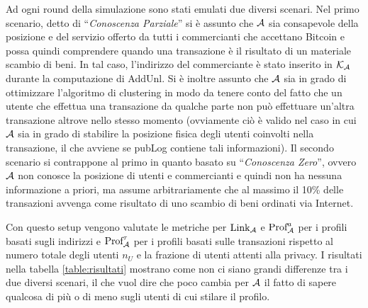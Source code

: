Ad ogni round della simulazione sono stati emulati due diversi scenari.
Nel primo scenario, detto di ``\emph{Conoscenza Parziale}'' si è assunto che $\mathcal{A}$ sia consapevole della posizione e del servizio offerto da tutti i commercianti che accettano Bitcoin e possa quindi comprendere quando una transazione è il risultato di un materiale scambio di beni. In tal caso, l'indirizzo del commerciante è stato inserito in $\mathcal{K}_\mathcal{A}$ durante la computazione di AddUnl. Si è inoltre assunto che $\mathcal{A}$ sia in grado di ottimizzare l'algoritmo di clustering in modo da tenere conto del fatto che un utente che effettua una transazione da qualche parte non può effettuare un'altra transazione altrove nello stesso momento (ovviamente ciò è valido nel caso in cui $\mathcal{A}$ sia in grado di stabilire la posizione fisica degli utenti coinvolti nella transazione, il che avviene se pubLog contiene tali informazioni).
Il secondo scenario si contrappone al primo in quanto basato su ``\emph{Conoscenza Zero}'', ovvero $\mathcal{A}$ non conosce la posizione di utenti e commercianti e quindi non ha nessuna informazione a priori, ma assume arbitrariamente che al massimo il 10\% delle transazioni avvenga come risultato di uno scambio di beni ordinati via Internet.

Con questo setup vengono valutate le metriche per $\text{Link}_{\mathcal{A}}$ e $\text{Prof}^a_{\mathcal{A}}$ per i profili basati sugli indirizzi e $\text{Prof}^\tau_{\mathcal{A}}$ per i profili basati sulle transazioni rispetto al numero totale degli utenti $n_U$ e la frazione di utenti attenti alla privacy.
I risultati nella tabella \ref{table:risultati} mostrano come non ci siano grandi differenze tra i due diversi scenari, il che vuol dire che poco cambia per $\mathcal{A}$ il fatto di sapere qualcosa di più o di meno sugli utenti di cui stilare il profilo.

